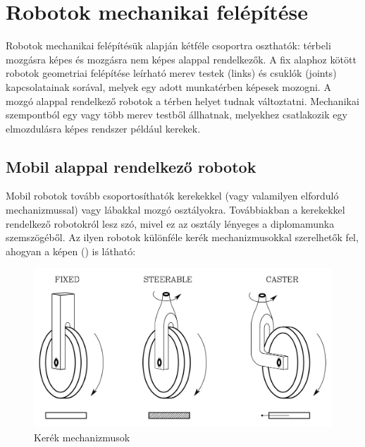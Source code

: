 \section{Robotok mechanikai felépítése}
Robotok mechanikai felépítésük alapján kétféle csoportra oszthatók: térbeli mozgásra képes és mozgásra nem képes alappal rendelkezők. A fix alaphoz kötött robotok geometriai felépítése leírható merev testek (links) és csuklók (joints) kapcsolatainak sorával, melyek egy adott munkatérben képesek mozogni. A mozgó alappal rendelkező robotok a térben helyet tudnak változtatni. Mechanikai szempontból egy vagy több merev testből állhatnak, melyekhez csatlakozik egy elmozdulásra képes rendszer például kerekek. \cite{siciliano2010robotics}

\subsection{Mobil alappal rendelkező robotok}
Mobil robotok tovább csoportosíthatók kerekekkel (vagy valamilyen elforduló mechanizmussal) vagy lábakkal mozgó osztályokra. Továbbiakban a kerekekkel rendelkező robotokról lesz szó, mivel ez az osztály lényeges a diplomamunka szemszögéből. Az ilyen robotok különféle kerék mechanizmusokkal szerelhetők fel, ahogyan a képen () is látható:
\begin{figure}[!ht]
    \centering
    \includegraphics[width=150mm, keepaspectratio]{figures/021_wheels.png}
    \caption{Kerék mechanizmusok \cite{siciliano2010robotics}}
    \label{fig:wheels}
\end{figure}

